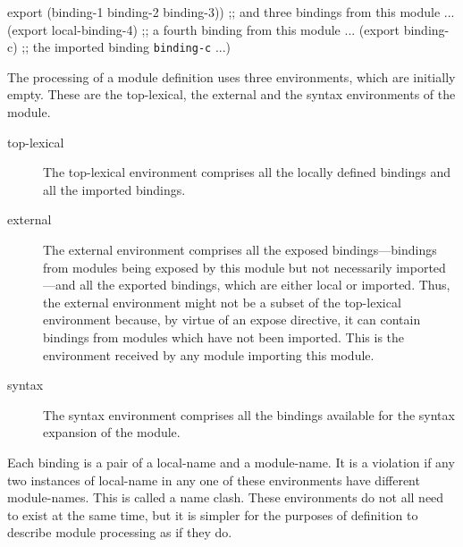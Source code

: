\begin{optDefinition}
\begin{figure*}[t]
\begin{example}
\begin{center}
\begin{minipage}[t]{\textwidth}
{   export
    (binding-1 binding-2 binding-3))                 ;; and three bindings from this module
  ...
  (export local-binding-4)                           ;; a fourth binding from this module
  ...
  (export binding-c)                                 ;; the imported binding {\tt binding-c}
  ...)
\endsyntax
}
\end{minipage}
\end{center}
\end{example}
\end{figure*}
%
The processing of a module definition uses three environments, which are
initially empty.  These are the top-lexical, the external and the syntax
environments of the module.
%
\begin{description}
    \item[top-lexical] The top-lexical environment comprises all the locally
    defined bindings and all the imported bindings.

    \item[external] The external environment comprises all the exposed
    bindings---bindings from modules being exposed by this module but not
    necessarily imported---and all the exported bindings, which are either local
    or imported.  Thus, the external environment might not be a subset of the
    top-lexical environment because, by virtue of an expose directive, it can
    contain bindings from modules which have not been imported.  This is the
    environment received by any module importing this module.

    \item[syntax] The syntax environment comprises all the bindings available
    for the syntax expansion of the module.
\end{description}
%
Each binding is a pair of a local-name and a module-name.  It is a violation
if any two instances of local-name in any one of these environments have
different module-names.  This is called a name clash.  These environments do not
all need to exist at the same time, but it is simpler for the purposes of
definition to describe module processing as if they do.
\end{optDefinition}


